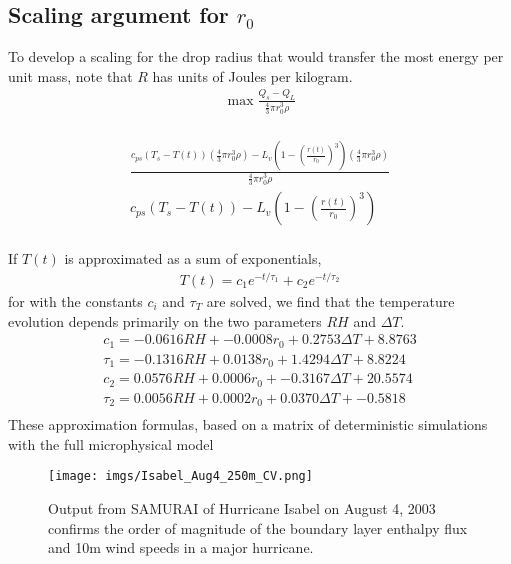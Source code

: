 \documentclass[17pt,a4paper]{article}
\begin{document}
\subsection*{Scaling argument for $r_0$}
To develop a scaling for the drop radius that would transfer the most energy per unit mass, note that $R$ has units of Joules per kilogram.
\begin{align}
\max \frac{Q_s-Q_L}{\frac{4}{3}\pi r_0^3 \rho}\\
\end{align}

\begin{align*}
\frac{c_{ps} (T_s-T(t))\left( \frac{4}{3}\pi r_0^3 \rho\right)-L_v \left(1-\left(\frac{r(t)}{r_0}\right)^3\right)\left( \frac{4}{3}\pi r_0^3 \rho\right)}{\frac{4}{3}\pi r_0^3 \rho}\\
c_{ps} (T_s-T(t))-L_v \left(1-\left(\frac{r(t)}{r_0}\right)^3\right)\\
\end{align*}

If $T(t)$ is approximated as a sum of exponentials,
\begin{align}
T(t) = c_1e^{-t/\tau_1}+c_2e^{-t/\tau_2}
\end{align}
for with the constants $c_i$ and $\tau_T$ are solved, we find that the temperature evolution depends primarily on the two parameters $RH$ and $\Delta T$. 
\begin{align}
 c_1 =   -0.0616 RH  + -0.0008 r_0  + 0.2753 \Delta T +   8.8763\\
 \tau_1 =   -0.1316 RH  +    0.0138 r_0  +    1.4294 \Delta T +    8.8224\\
 c_2 =    0.0576 RH  +    0.0006 r_0  +   -0.3167 \Delta T +   20.5574\\
 \tau_2 =     0.0056 RH  +    0.0002 r_0  +    0.0370 \Delta T +  -0.5818\\
\end{align}
These approximation formulas, based on a matrix of deterministic simulations with the full microphysical model


\newpage
\begin{figure}[!h]
\centering
\texttt{[image: imgs/Isabel\_Aug4\_250m\_CV.png]}\\
\caption{Output from SAMURAI of Hurricane Isabel on August 4, 2003 confirms the order of magnitude of the boundary layer enthalpy flux and 10m wind speeds in a major hurricane. \label{Fig:Isabel}}
\end{figure}
\end{document}
